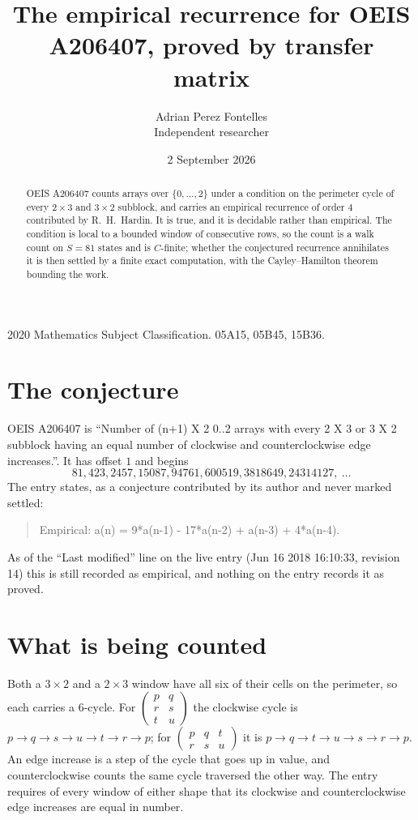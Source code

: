 \documentclass[11pt,a4paper]{article}
\title{The empirical recurrence for OEIS A206407, proved by transfer matrix}
\author{Adrian Perez Fontelles\\ \small Independent researcher}
\date{2 September 2026}
\theoremstyle{plain}
\theoremstyle{definition}
\begin{document}
\maketitle

\begin{abstract}
OEIS A206407 counts arrays over $\{0,\dots,2\}$ under a condition on the perimeter cycle of
every $2\times3$ and $3\times2$ subblock, and carries an empirical recurrence of order $4$ contributed by
R.~H.~Hardin. It is true, and it is decidable rather than empirical. The condition is local to
a bounded window of consecutive rows, so the count is a walk count on $S=81$ states and is
$C$-finite; whether the conjectured recurrence annihilates it is then settled by a finite exact
computation, with the Cayley--Hamilton theorem bounding the work.
\end{abstract}

\noindent\small 2020 Mathematics Subject Classification. 05A15, 05B45, 15B36.\normalsize

\section{The conjecture}

OEIS A206407 is ``Number of (n+1) X 2 0..2 arrays with every 2 X 3 or 3 X 2 subblock having an equal number of clockwise and counterclockwise edge increases.''. It has offset $1$ and begins
\[
81, 423, 2457, 15087, 94761, 600519, 3818649, 24314127,\ \dots
\]
The entry states, as a conjecture contributed by its author and never marked settled:
\begin{quote}
Empirical: a(n) = 9*a(n-1) - 17*a(n-2) + a(n-3) + 4*a(n-4).
\end{quote}
As of the ``Last modified'' line on the live entry (Jun 16 2018 16:10:33, revision 14) this is still
recorded as empirical, and nothing on the entry records it as proved.

\section{What is being counted}

Both a $3\times2$ and a $2\times3$ window have all six of their cells on the
perimeter, so each carries a $6$-cycle. For
$\begin{pmatrix}p&q\\r&s\\t&u\end{pmatrix}$ the clockwise cycle is
$p\to q\to s\to u\to t\to r\to p$; for
$\begin{pmatrix}p&q&t\\r&s&u\end{pmatrix}$ it is
$p\to q\to t\to u\to s\to r\to p$. An edge increase is a step of the cycle that goes up in
value, and counterclockwise counts the same cycle traversed the other way. The entry requires
of every window of either shape that its clockwise and counterclockwise edge increases are equal in number.
\end{document}

